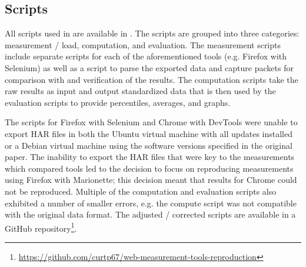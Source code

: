 \subsection{Scripts}
\label{sec:scripts}
All scripts used in \cite{10.1007/978-3-030-15986-3_19} are available in \cite{enghardt_2019}. The scripts are grouped into three categories: measurement / load, computation, and evaluation. The measurement scripts include separate scripts for each of the aforementioned tools (e.g. Firefox with Selenium) as well as a script to parse the exported data and capture packets for comparison with and verification of the results. The computation scripts take the raw results as input and output standardized data that is then used by the evaluation scripts to provide percentiles, averages, and graphs.

The scripts for Firefox with Selenium and Chrome with DevTools were unable to export HAR files in both the Ubuntu virtual machine with all updates installed or a Debian virtual machine using the software versions specified in the original paper. The inability to export the HAR files that were key to the measurements which compared tools led to the decision to focus on reproducing measurements using Firefox with Marionette; this decision meant that results for Chrome could not be reproduced. Multiple of the computation and evaluation scripts also exhibited a number of smaller errors, e.g. the compute script was not compatible with the original data format. The adjusted / corrected scripts are available in a GitHub repository\footnote{\url{https://github.com/curtp67/web-measurement-tools-reproduction}}.
